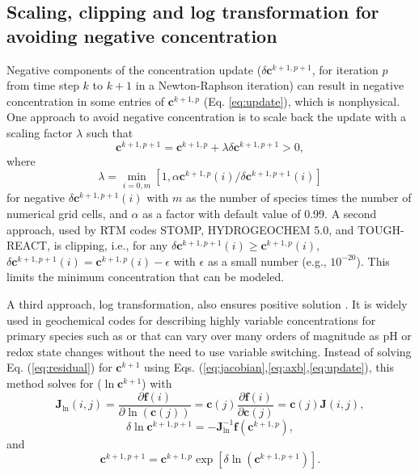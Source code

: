 \documentclass[gmd, manuscript]{copernicus}
\begin{document}
\subsection{Scaling, clipping and log transformation for avoiding negative concentration}
Negative components of the concentration update ($\delta\mathbf{c}^{k+1,p+1}$, for iteration $p$ from time step $k$ to $k+1$ in a Newton-Raphson iteration) can result in negative
concentration in some entries of $\mathbf{c}^{k+1,p}$ (Eq. \ref{eq:update}),
which is nonphysical. One approach to avoid negative concentration is to scale
back the update with a scaling factor $\lambda$ \citep{Bethke2007,Hammond2003}
such that 
\begin{equation}
\mathbf{c}^{k+1,p+1}=\mathbf{c}^{k+1,p}+\lambda \delta \mathbf{c}^{k+1,p+1} > 0,
\label{eq:lambda}
\end{equation}
where
\begin{equation}
\lambda = \min_{i=0,m}\left[1, \alpha {\mathbf{c}^{k+1,p}(i)}/{\delta \mathbf{c}^{k+1,p+1} (i)}\right]
\label{eq:alpha}
\end{equation}
for negative $\delta \mathbf{c}^{k+1,p+1} (i)$ with $m$ as the number of species
times the number of numerical grid cells, and $\alpha$ as a factor with default value of 0.99. 
A second approach, used by RTM codes STOMP, HYDROGEOCHEM 5.0,
and TOUGH-REACT, is clipping, i.e., for any $\delta \mathbf{c}^{k+1,p+1}(i)
\geq \mathbf{c}^{k+1,p}(i)$, $\delta \mathbf{c}^{k+1,p+1}(i) =
\mathbf{c}^{k+1,p}(i) - \epsilon$  with $\epsilon$ as a small number (e.g.,
$10^{-20}$). This limits the minimum concentration that can be modeled. 

A third approach, log transformation, also ensures positive solution
\citep{Bethke2007,Hammond2003,Parkhurst1999}. It is widely used in geochemical
codes for describing highly variable concentrations for primary species such as
 or  that can vary over many orders of magnitude as pH or
redox state changes without the need to use variable switching. Instead of
solving Eq. (\ref{eq:residual}) for $\mathbf{c}^{k+1}$ using Eqs.
(\ref{eq:jacobian},\ref{eq:axb},\ref{eq:update}), this method solves for
($\ln\mathbf{c}^{k+1}$) \citep{Hammond2003} with 
\begin{equation}
\mathbf{J}_{\ln}(i,j)=\frac{\partial \mathbf{f}(i)}{\partial
\ln(\mathbf{c}(j))} = \mathbf{c}(j) \frac{\partial
\mathbf{f}(i)}{\partial \mathbf{c}(j)} = \mathbf{c}(j) \mathbf{J}(i,j),
\label{eq:jacobianlt}
\end{equation}
\begin{equation}
\delta \ln\mathbf{c}^{k+1,p+1}= -\mathbf{J}^{-1}_{\ln} \mathbf{f} (\mathbf{c}^{k+1,p}),
\label{eq:axblt}
\end{equation}
and
\begin{equation}
\mathbf{c}^{k+1,p+1}=\mathbf{c}^{k+1,p}\exp\left[\delta
\ln(\mathbf{c}^{k+1,p+1})\right].
\label{eq:updatelt}	
\end{equation}
\end{document}
